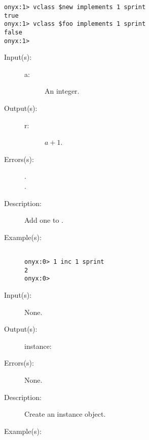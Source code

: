 \begin{description}
\begin{description}
\begin{verbatim}
onyx:1> vclass $new implements 1 sprint
true
onyx:1> vclass $foo implements 1 sprint
false
onyx:1>
		\end{verbatim}
	\end{description}
\label{systemdict:inc}
\item[{\onyxop{a}{inc}{r}}: ]
	\begin{description}\item[]
	\item[Input(s): ]
		\begin{description}\item[]
		\item[a: ]
			An integer.
		\end{description}
	\item[Output(s): ]
		\begin{description}\item[]
		\item[r: ]
			$a + 1$.
		\end{description}
	\item[Errors(s): ]
		\begin{description}\item[]
		\item[.]
		\item[.]
		\end{description}
	\item[Description: ]
		Add one to .
	\item[Example(s): ]\begin{verbatim}

onyx:0> 1 inc 1 sprint
2
onyx:0>
		\end{verbatim}
	\end{description}
\label{systemdict:instance}
\item[{\onyxop{--}{instance}{instance}}: ]
	\begin{description}\item[]
	\item[Input(s): ] None.
	\item[Output(s): ]
		\begin{description}\item[]
		\item[instance: ]
		\end{description}
	\item[Errors(s): ] None.
	\item[Description: ]
		Create an instance object.
	\item[Example(s): ]\begin{verbatim}


\end{verbatim}
\end{description}
\end{description}

